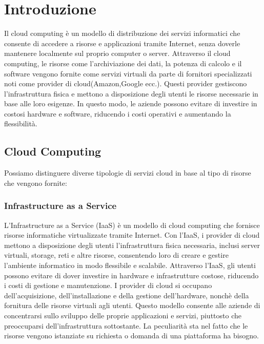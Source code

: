 \documentclass[../main.tex]{subfiles}
\begin{document}
    
\chapter{Introduzione}

Il cloud computing è un modello di distribuzione dei servizi informatici che consente di accedere a risorse e applicazioni tramite Internet, senza doverle mantenere localmente sul proprio computer o server. 
Attraverso il cloud computing, le risorse come l'archiviazione dei dati, la potenza di calcolo e il software vengono fornite come servizi virtuali da parte di fornitori specializzati noti come provider di cloud(Amazon,Google ecc.).
Questi provider gestiscono l'infrastruttura fisica e mettono a disposizione degli utenti le risorse necessarie in base alle loro esigenze. In questo modo, le aziende possono evitare di investire in costosi hardware e software, riducendo i costi operativi e aumentando la flessibilità.

\section{Cloud Computing}
Possiamo distinguere diverse tipologie di servizi cloud in base al tipo di risorse che vengono fornite:
\subsection{Infrastructure as a Service}
L'Infrastructure as a Service (IaaS) è un modello di cloud computing che fornisce risorse informatiche virtualizzate tramite Internet. Con l'IaaS, i provider di cloud mettono a disposizione degli utenti l'infrastruttura fisica necessaria, inclusi server virtuali, storage, reti e altre risorse, consentendo loro di creare e gestire l'ambiente informatico in modo flessibile e scalabile.
Attraverso l'IaaS, gli utenti possono evitare di dover investire in hardware e infrastrutture costose, riducendo i costi di gestione e manutenzione. I provider di cloud si occupano dell'acquisizione, dell'installazione e della gestione dell'hardware, nonchè della fornitura delle risorse virtuali agli utenti. Questo modello consente alle aziende di concentrarsi sullo sviluppo delle proprie applicazioni e servizi, piuttosto che preoccuparsi dell'infrastruttura sottostante.
La peculiarità sta nel fatto che le risorse vengono istanziate su richiesta o domanda di una piattaforma ha bisogno.
\end{document}
